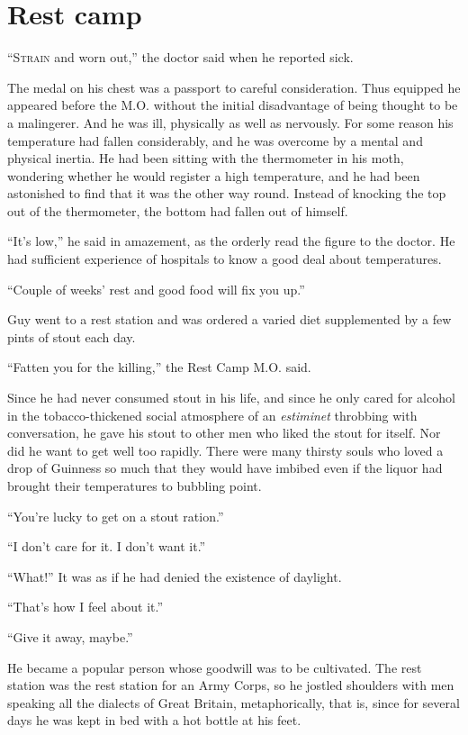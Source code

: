 \chapter*{\textsf{Rest camp}}

``S\textsc{train} and worn out,'' the doctor said when he reported sick.

The medal on his chest was a passport to careful consideration. Thus equipped he appeared before the M.O. without the initial disadvantage of being thought to be a malingerer. And he was ill, physically as well as nervously. For some reason his temperature had fallen considerably, and he was overcome by a mental and physical inertia. He had been sitting with the thermometer in his moth, wondering whether he would register a high temperature, and he had been astonished to find that it was the other way round. Instead of knocking the top out of the thermometer, the bottom had fallen out of himself.

``It's low,'' he said in amazement, as the orderly read the figure to the doctor. He had sufficient experience of hospitals to know a good deal about temperatures.

``Couple of weeks' rest and good food will fix you up.''

Guy went to a rest station and was ordered a varied diet supplemented by a few pints of stout each day.

``Fatten you for the killing,'' the Rest Camp M.O. said.

Since he had never consumed stout in his life, and since he only cared for alcohol in the tobacco-thickened social atmosphere of an \emph{estiminet} throbbing with conversation, he gave his stout to other men who liked the stout for itself. Nor did he want to get well too rapidly. There were many thirsty souls who loved a drop of Guinness so much that they would have imbibed even if the liquor had brought their temperatures to bubbling point.

``You're lucky to get on a stout ration.''

``I don't care for it. I don't want it.''

``What!'' It was as if he had denied the existence of daylight.

``That's how I feel about it.''

``Give it away, maybe.''

He became a popular person whose goodwill was to be cultivated. The rest station was the rest station for an Army Corps, so he jostled shoulders with men speaking all the dialects of Great Britain, metaphorically, that is, since for several days he was kept in bed with a hot bottle at his feet.

